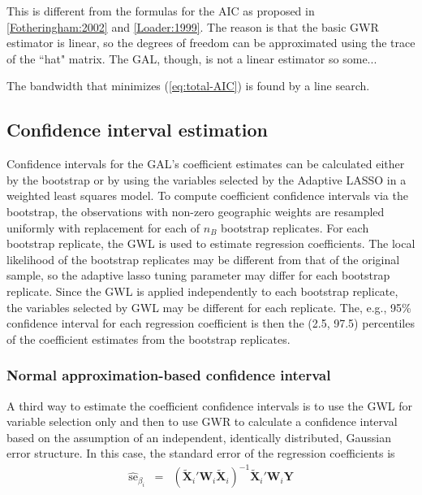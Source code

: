 \documentclass[authoryear, review, 11pt]{elsarticle}
\begin{document}
	This is different from the formulas for the AIC as proposed in \ref{Fotheringham:2002} and \ref{Loader:1999}. The reason is that the basic GWR estimator is linear, so the degrees of freedom can be approximated using the trace of the ``hat" matrix. The GAL, though, is not a linear estimator so some...\
	
	The bandwidth that minimizes (\ref{eq:total-AIC}) is found by a line search.\\
	
	\subsection{Confidence interval estimation}	
	Confidence intervals for the GAL's coefficient estimates can be calculated either by the bootstrap \citep{Efron:1986} or by using the variables selected by the Adaptive LASSO in a weighted least squares model. To compute coefficient confidence intervals via the bootstrap, the observations with non-zero geographic weights are resampled uniformly with replacement for each of $n_B$ bootstrap replicates. For each bootstrap replicate, the GWL is used to estimate regression coefficients. The local likelihood of the bootstrap replicates may be different from that of the original sample, so the adaptive lasso tuning parameter may differ for each bootstrap replicate. Since the GWL is applied independently to each bootstrap replicate, the variables selected by GWL may be different for each replicate. The, e.g., 95\% confidence interval for each regression coefficient is then the (2.5, 97.5) percentiles of the coefficient estimates from the bootstrap replicates.\\
	 
	 	\subsubsection{Normal approximation-based confidence interval}
		A third way to estimate the coefficient confidence intervals is to use the GWL for variable selection only and then to use GWR to calculate a confidence interval based on the assumption of an independent, identically distributed, Gaussian error structure. In this case, the standard error of the regression coefficients is 
		\begin{eqnarray}
			\hat{\mbox{se}}_{\beta_i} &=& \left( \tilde{\bm{X}}_i'\bm{W}_i \tilde{\bm{X}}_i \right)^{-1}  \tilde{\bm{X}}_i'\bm{W}_i\bm{Y}
		\end{eqnarray}
	
\end{document}
